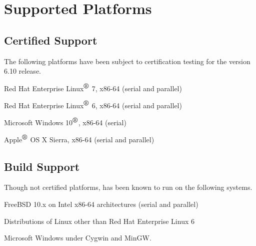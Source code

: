 \documentclass{article}
\begin{document}
\newpage
\section{Supported Platforms}
\subsection*{Certified Support}
The following platforms have been subject to certification testing for the
\Xyce{} version 6.10 release.
\begin{XyceItemize}
  \item Red Hat Enterprise Linux${}^{\mbox{\textregistered}}$ 7, x86-64 (serial and parallel)
  \item Red Hat Enterprise Linux${}^{\mbox{\textregistered}}$ 6, x86-64 (serial and parallel)
  \item Microsoft Windows 10${}^{\mbox{\textregistered}}$, x86-64 (serial)
  \item Apple${}^{\mbox{\textregistered}}$ OS X Sierra, x86-64 (serial and parallel)
\end{XyceItemize}

\subsection*{Build Support}
Though not certified platforms, \Xyce{} has been known to run on the following
systems.
\begin{XyceItemize}
  \item FreeBSD 10.x on Intel x86-64 architectures (serial and parallel)
  \item Distributions of Linux other than Red Hat Enterprise Linux 6
  \item Microsoft Windows under Cygwin and MinGW.
\end{XyceItemize}
\end{document}
